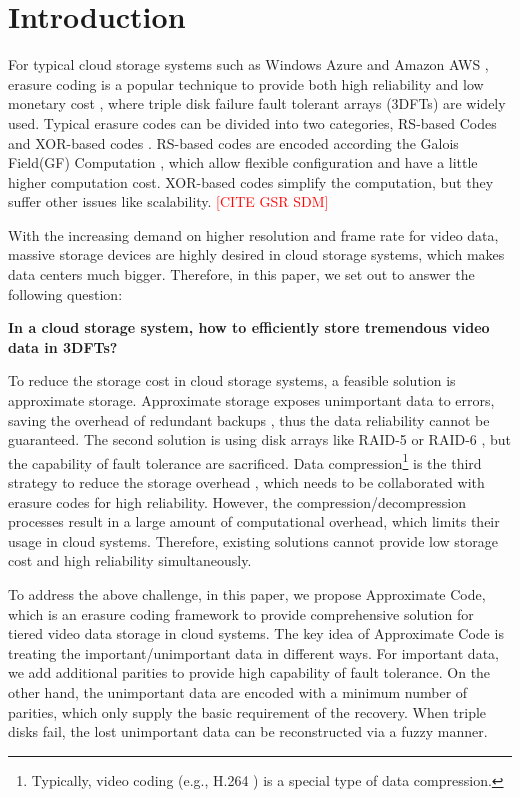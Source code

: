 \documentclass[sigconf]{acmart}
\begin{document}
\section{Introduction}
For typical cloud storage systems such as Windows Azure \cite{calder2011windows} and Amazon AWS \cite{bermudez2013exploring}, erasure coding is a popular technique to provide both high reliability and low monetary cost \cite{EVENODD, RDP, BlaumRoth, XCode, CRS, TripleStar, TPtech, RSL}, where triple disk failure fault tolerant arrays (3DFTs) are widely used. Typical erasure codes can be divided into two categories, RS-based Codes \cite{RS} \cite{LRC} and XOR-based codes \cite{EVENODD, hcode, STAR, tip}. RS-based codes are encoded according the Galois Field(GF) Computation \cite{RS}, which allow flexible configuration and have a little higher computation cost. XOR-based codes simplify the computation, but they suffer other issues like scalability. \textcolor{red}{[CITE GSR SDM]}

With the increasing demand on higher resolution and frame rate for video data, massive storage devices are highly desired in cloud storage systems, which makes data centers much bigger.
Therefore, in this paper, we set out to answer the following question:

\textbf{In a cloud storage system, how to efficiently store tremendous video data in 3DFTs?}

To reduce the storage cost in cloud storage systems, a feasible solution is approximate storage. Approximate storage exposes unimportant data to errors, saving the overhead of redundant backups \cite{niklaus2018context, sampson2014approximate} , thus the data reliability cannot be guaranteed.
The second solution is using disk arrays like RAID-5 or RAID-6 \cite{RAID}, but the capability of fault tolerance are sacrificed.
Data compression\footnote{Typically, video coding (e.g., H.264 \cite{wiegand2003overview}) is a special type of data compression.}
is the third strategy to reduce the storage overhead \cite{ziv1977universal, ziv1978compression, deutsch1996deflate}, which needs to be collaborated with erasure codes for high reliability. However, the compression/decompression processes result in a large amount of computational overhead, which limits their usage in cloud systems. 
Therefore, existing solutions cannot provide low storage cost and high reliability simultaneously.

To address the above challenge, in this paper, we propose Approximate Code, which is an erasure coding framework to provide comprehensive solution for tiered video data storage in cloud systems. The key idea of Approximate Code is treating the important/unimportant data in different ways. For important data, we add additional parities to provide high capability of fault tolerance. On the other hand, the unimportant data are encoded with a minimum number of parities, which only supply the basic requirement of the recovery. When triple disks fail, the lost unimportant data can be reconstructed via a fuzzy manner.
\end{document}
